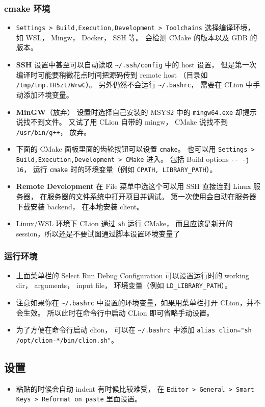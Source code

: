 \subsubsection{cmake 环境}
\begin{itemize}
\item \verb|Settings > Build,Execution,Development > Toolchains| 选择编译环境， 如 WSL， Mingw， Docker， SSH 等。 会检测 CMake 的版本以及 GDB 的版本。
\item \textbf{SSH} 设置中甚至可以自动读取 \verb|~/.ssh/config| 中的 host 设置， 但是第一次编译时可能要稍微花点时间把源码传到 remote host （目录如 \verb|/tmp/tmp.TH5zt7WrwC|）。 另外仍然不会运行 \verb|~/.bashrc|， 需要在 CLion 中手动添加环境变量。
\item \textbf{MinGW}（放弃） 设置时选择自己安装的 MSYS2 中的 \verb|mingw64.exe| 却提示说找不到文件。 又试了用 CLion 自带的 mingw， CMake 说找不到 \verb|/usr/bin/g++|， 放弃。
\item 下面的 CMake 面板里面的齿轮按钮可以设置 \verb|cmake|。 也可以用 \verb|Settings > Build,Execution,Development > CMake| 进入。 包括 Build options \verb|-- -j 16|， 运行 \verb|cmake| 时的环境变量（例如 \verb|CPATH, LIBRARY_PATH|）。
\item \textbf{Remote Development} 在 File 菜单中选这个可以用 SSH 直接连到 Linux 服务器， 在服务器的文件系统中打开项目并调试。 第一次使用会自动在服务器下载安装 backend， 在本地安装 client。
\item Linux/WSL 环境下 CLion 通过 \verb|sh| 运行 CMake， 而且应该是新开的 session，所以还是不要试图通过脚本设置环境变量了
\end{itemize}

\subsubsection{运行环境}
\begin{itemize}
\item 上面菜单栏的 Select Run Debug Configuration 可以设置运行时的 working dir， arguments， input file， 环境变量（例如 \verb|LD_LIBRARY_PATH|）。
\item 注意如果你在 \verb|~/.bashrc| 中设置的环境变量，如果用菜单栏打开 CLion，并不会生效。 所以此时在命令行中启动 CLion 即可省略手动设置。
\item 为了方便在命令行启动 clion， 可以在 \verb|~/.bashrc| 中添加 \verb|alias clion="sh /opt/clion-*/bin/clion.sh"|。
\end{itemize}

\subsection{设置}
\begin{itemize}
\item 粘贴的时候会自动 indent 有时候比较难受， 在 \verb|Editor > General > Smart Keys > Reformat on paste| 里面设置。
\end{itemize}
